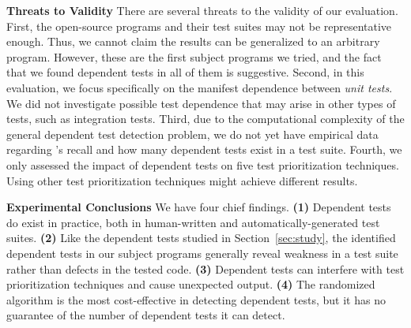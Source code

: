 \vspace{1mm}
\noindent \textbf{Threats to Validity}
There are several threats to the validity of our evaluation.
First, the \subjnum open-source
programs and their test suites may not be
representative enough. Thus, we cannot claim the results
can be generalized to an arbitrary program.
However, these are the first \subjnum subject programs
we tried, and the fact that we found dependent tests
in all of them is suggestive.
Second, in this evaluation, we focus specifically on
the {manifest dependence} between \textit{unit tests}.
We did not investigate possible test dependence that may arise
in other types of tests, such as integration tests.
Third, due to the computational complexity of the general dependent test
detection problem, we do not yet have
empirical data regarding \ourtool's recall and how many dependent
tests exist in a test suite. 
Fourth, we only assessed the
impact of dependent tests on five test prioritization
techniques.
Using other test prioritization techniques
might achieve different results. 


\vspace{1mm}

\noindent \textbf{Experimental Conclusions}
We have four chief findings. \textbf{(1)}
Dependent tests do exist in practice, both in
human-written and automatically-generated test suites.
\textbf{(2)} Like the dependent tests
studied in Section~\ref{sec:study}, the identified
dependent tests in our subject programs generally reveal weakness
in a test suite rather than defects in the tested code.
\textbf{(3)} Dependent tests can interfere with
test prioritization techniques and cause unexpected output.
\textbf{(4)} 
The randomized algorithm is the most cost-effective in
detecting dependent tests, but it has no guarantee
of the number of dependent tests it can detect.


